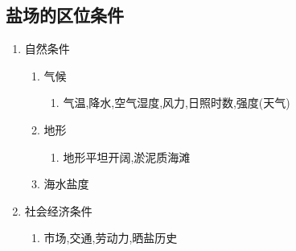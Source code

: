 \documentclass[a4paper]{article}
\begin{document}
    \subsection{盐场的区位条件}
    \begin{enumerate}
        \item 自然条件
        \begin{enumerate}
            \item 气候
            \begin{enumerate}
                \item 气温,降水,空气湿度,风力,日照时数,强度(天气)
            \end{enumerate}
            \item 地形
            \begin{enumerate}
                \item 地形平坦开阔,淤泥质海滩
            \end{enumerate}
            \item 海水盐度
        \end{enumerate}
        \item 社会经济条件
        \begin{enumerate}
            \item 市场,交通,劳动力,晒盐历史
        \end{enumerate}
    \end{enumerate}
\end{document}
